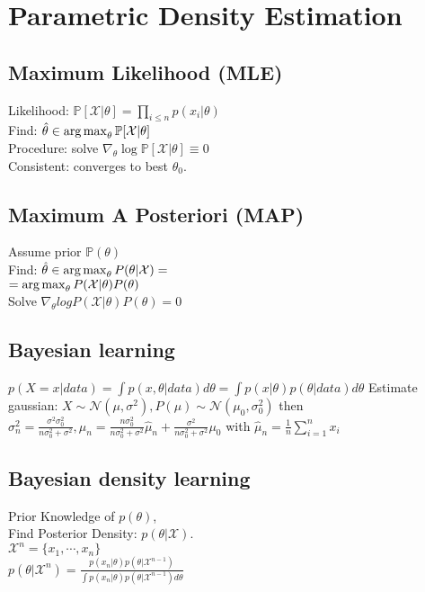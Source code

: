 \section*{Parametric Density Estimation}
\subsection*{Maximum Likelihood (MLE)}
Likelihood: $\mathbb{P}[\mathcal{X}|\theta]=\prod_{i\leq n}p(x_i|\theta)$\\
Find: $\hat{\theta}\in \operatorname*{arg\,max}_\theta \mathbb{P}[\mathcal{X}|\theta]$\\
Procedure: solve $\nabla_\theta \log \mathbb{P}[\mathcal{X}|\theta]\equiv 0$\\
Consistent: converges to best $\theta_0$.

\subsection*{Maximum A Posteriori (MAP)}
Assume prior $\mathbb{P}(\theta)$\\
Find: $\hat{\theta}\in \operatorname*{arg\,max}_\theta P(\theta|\mathcal{X}) =$\\
$=\operatorname*{arg\,max}_\theta P(\mathcal{X}|\theta)P(\theta)$\\
Solve $\nabla_\theta log P(\mathcal{X}|\theta)P(\theta)=0$

\subsection*{Bayesian learning}
$p(X=x|data) = \int p(x, \theta | data) d\theta = \int p(x|\theta)p(\theta|data)d\theta$
Estimate gaussian: $X \sim \mathcal{N}(\mu, \sigma^2), P(\mu) \sim \mathcal{N}(\mu_0, \sigma_0^2)$ then $\sigma_n^2 = \frac{\sigma^2 \sigma_0^2}{n\sigma_0^2 + \sigma^2}, \mu_n = \frac{n\sigma_0^2}{n\sigma_0^2 + \sigma^2} \hat \mu_n + \frac{\sigma^2}{n\sigma_0^2 + \sigma^2}\mu_0$ with $\hat \mu_n = \frac{1}{n}\sum_{i=1}^n x_i$
\subsection*{Bayesian density learning}
Prior Knowledge of $p(\theta)$,\\
Find Posterior Density: $p(\theta|\mathcal{X})$.\\
$\mathcal{X}^n=\{x_1, \cdots, x_n\}$\\
$p(\theta|\mathcal{X}^n)=\frac{p(x_n|\theta)p(\theta|\mathcal{X}^{n-1})}{\int p(x_n|\theta)p(\theta|\mathcal{X}^{n-1}) d\theta}$


